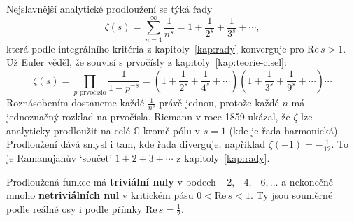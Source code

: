 Nejslavnější analytické prodloužení se týká řady
\begin{equation*}
  \zeta(s) = \sum_{n=1}^{\infty}\frac{1}{n^s} = 1 + \frac{1}{2^s} + \frac{1}{3^s} + \cdots,
\end{equation*}
která podle integrálního kritéria z kapitoly~\ref{kap:rady} konverguje pro $\mathrm{Re}\,s > 1$. Už Euler věděl, že souvisí s prvočísly z kapitoly~\ref{kap:teorie-cisel}:
\begin{equation*}
  \zeta(s) = \prod_{p\text{ prvočíslo}}\frac{1}{1 - p^{-s}} = \left(1 + \frac{1}{2^s} + \frac{1}{4^s} + \cdots\right)\left(1 + \frac{1}{3^s} + \frac{1}{9^s} + \cdots\right)\cdots
\end{equation*}
Roznásobením dostaneme každé $\frac{1}{n^s}$ právě jednou, protože každé $n$ má jednoznačný rozklad na prvočísla. Riemann v roce 1859 ukázal, že $\zeta$ lze analyticky prodloužit na celé $\mathbb{C}$ kromě pólu v $s = 1$ (kde je řada harmonická). Prodloužení dává smysl i tam, kde řada diverguje, například $\zeta(-1) = -\frac{1}{12}$. To je Ramanujanův `součet' $1 + 2 + 3 + \cdots$ z kapitoly~\ref{kap:rady}.

\begin{center}
\end{center}

Prodloužená funkce má \textbf{triviální nuly} v bodech $-2, -4, -6, \ldots$ a nekonečně mnoho \textbf{netriviálních nul} v kritickém pásu $0 < \mathrm{Re}\,s < 1$. Ty jsou souměrné podle reálné osy i podle přímky $\mathrm{Re}\,s = \frac{1}{2}$.

